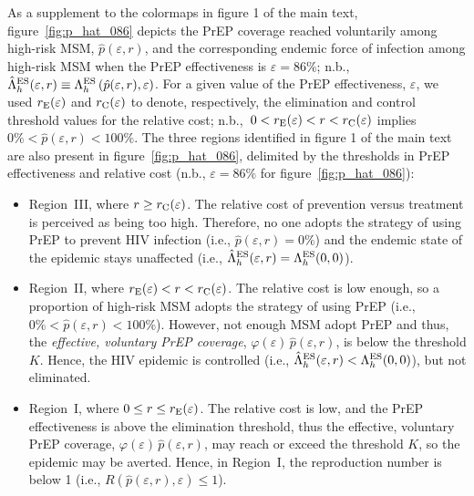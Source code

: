 \documentclass[12pt]{article}
\begin{document}
As a supplement to the colormaps in figure 1 of the main text, figure~\ref{fig:p_hat_086} depicts the PrEP coverage reached voluntarily among high-risk MSM, $\hat{p}(\varepsilon,r)$, and the corresponding endemic force of infection among high-risk MSM when the PrEP effectiveness is $\varepsilon=86\%$; n.b., $\hat{\Lambda}_h^{\rm ES}(\varepsilon,r) \equiv \Lambda_h^{\rm ES}\left(\hat{p}(\varepsilon,r),\varepsilon\right)$. For a given value of the PrEP effectiveness, $\varepsilon$, we used $r_{\rm E}(\varepsilon)$ and $r_{\rm C}(\varepsilon)$ to denote, respectively, the elimination and control threshold values for the relative cost; n.b.,~$ 0 < r_{\rm E}(\varepsilon) < r < r_{\rm C}(\varepsilon)$ implies $0\%<\hat{p}(\varepsilon,r)<100\%$. The three regions identified in figure 1 of the main text are also present in figure~\ref{fig:p_hat_086}, delimited by the thresholds in PrEP effectiveness and relative cost (n.b., $\varepsilon=86\%$ for figure~\ref{fig:p_hat_086}):

\begin{itemize}
\item Region~III, where $r \geq r_{\rm C}(\varepsilon)$. The relative cost of prevention versus treatment is perceived as being too high. Therefore, no one adopts the strategy of using PrEP to prevent HIV infection (i.e., $\hat{p}(\varepsilon,r)=0\%$) and the endemic state of the epidemic stays unaffected (i.e., $\hat{\Lambda}_h^{\rm ES}(\varepsilon,r) = \Lambda_h^{\rm ES}(0,0)$). 

\item Region~II, where $r_{\rm E}(\varepsilon) < r < r_{\rm C}(\varepsilon)$. The relative cost is low enough, so a proportion of high-risk MSM adopts the strategy of using PrEP (i.e., $0 \%< \hat{p}(\varepsilon,r) <100\%$). However, not enough MSM adopt PrEP and thus, the \textit{effective, voluntary PrEP coverage}, $\varphi(\varepsilon) \, \hat{p}(\varepsilon,r)$, is below the threshold $K$. Hence, the HIV epidemic is controlled (i.e., $\hat{\Lambda}_h^{\rm ES}(\varepsilon,r) < \Lambda_h^{\rm ES}(0,0)$), but not eliminated. 

\item Region~I, where $0 \leq r\leq r_{\rm E}(\varepsilon)$. The relative cost is low, and the PrEP effectiveness is above the elimination threshold, thus the effective, voluntary PrEP coverage, $\varphi(\varepsilon) \, \hat{p}(\varepsilon,r)$, may reach or exceed the threshold $K$, so the epidemic may be averted. Hence, in Region~I, the reproduction number is below 1 (i.e., $R\left(\hat{p}(\varepsilon,r),\varepsilon\right) \leq 1$).
 \end{itemize}
 
\end{document}
